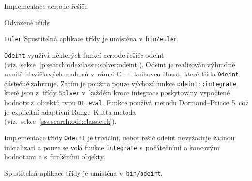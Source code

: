 \documentclass[thesis=M,czech]{FITthesis}[2012/06/26]
\newcommand{\acrlabel}[1]{acr:#1}
\newcommand{\acr}[1]{\acrshort{\acrlabel{#1}}}
\newcommand{\id}[1]{\texttt{#1}}
\newcommand{\rf}[1]{\ref{#1}}
\begin{document}
\begin{section}{Implementace \acr{ode} řešiče}
\begin{subsection}{Odvozené třídy}
\begin{paragraph}{\id{Euler}}
Spustitelná aplikace třídy je umístěna v~\id{bin/euler}.
\end{paragraph} %


\begin{paragraph}{\id{Odeint}}
\label{p:impl:ode:derived:odeint}
využívá některých funkcí \acr{ode} řešiče odeint
(viz.~sekce~\rf{p:search:ode:classic:solver:odeint}).
Odeint je realizován výhradně uvnitř hlavičkových souborů
v~rámci C++ knihoven Boost,
které třída \id{Odeint} částečně zahrnuje.
Zatím je použita pouze výchozí funkce
\id{odeint::\-integrate},
které jsou z~třídy \id{Solver}
v~každém kroce integrace poskytovány vypočtené
hodnoty z~objektů typu \id{Dt\_\-eval}.
Funkce používá metodu Dormand--Prince 5,
což je explicitní adaptivní Runge--Kutta metoda
(viz.~sekce~\rf{sss:search:ode:classic:rk}).

Implementace třídy \id{Odeint} je triviální,
neboť řešič odeint nevyžaduje žádnou
inicializaci a pouze se volá funkce \id{integrate}
s~počátečními a koncovými hodnotami
a s~funkčními objekty.

Spustitelná aplikace třídy je umístěna v~\id{bin/odeint}.
\end{paragraph} %


\end{subsection} %


\end{section} %

\end{document}
